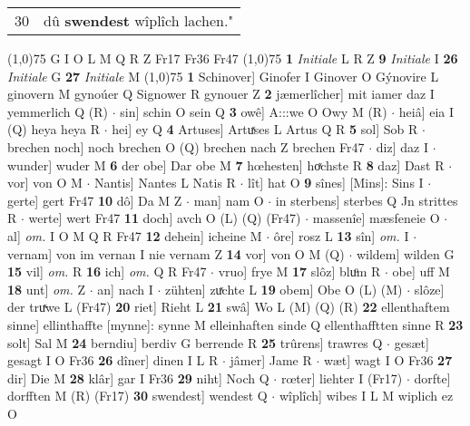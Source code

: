 \documentclass[8pt,a4paper,notitlepage]{article}
\begin{document}
\begin{table}[ht]
\begin{minipage}[t]{0.5\linewidth}
\begin{tabular}{rl}
30 & dû \textbf{swendest} wîplîch lachen."\\ 
\end{tabular}
\scriptsize
\line(1,0){75} \newline
G I O L M Q R Z Fr17 Fr36 Fr47 \newline
\line(1,0){75} \newline
\textbf{1} \textit{Initiale} L R Z  \textbf{9} \textit{Initiale} I  \textbf{26} \textit{Initiale} G  \textbf{27} \textit{Initiale} M  \newline
\line(1,0){75} \newline
\textbf{1} Schinover] Ginofer I Ginover O Gýnovire L ginovern M gynoúer Q Signower R gynouer Z \textbf{2} jæmerlîcher] mit iamer daz I yemmerlich Q (R)  $\cdot$ sin] schin O sein Q \textbf{3} owê] A:::we O Owy M (R)  $\cdot$ heiâ] eia I (Q) heya heya R  $\cdot$ hei] ey Q \textbf{4} Artuses] Artuͯses L Artus Q R \textbf{5} sol] Sob R  $\cdot$ brechen noch] noch brechen O (Q) brechen nach Z brechen Fr47  $\cdot$ diz] daz I  $\cdot$ wunder] wuder M \textbf{6} der obe] Dar obe M \textbf{7} hœhesten] hoͯchste R \textbf{8} daz] Dast R  $\cdot$ vor] von O M  $\cdot$ Nantis] Nantes L Natis R  $\cdot$ lît] hat O \textbf{9} sînes] [Mins]: Sins I  $\cdot$ gerte] gert Fr47 \textbf{10} dô] Da M Z  $\cdot$ man] nam O  $\cdot$ in sterbens] sterbes Q Jn strittes R  $\cdot$ werte] wert Fr47 \textbf{11} doch] avch O (L) (Q) (Fr47)  $\cdot$ massenîe] mæsfeneie O  $\cdot$ al] \textit{om.} I O M Q R Fr47 \textbf{12} dehein] icheine M  $\cdot$ ôre] rosz L \textbf{13} sîn] \textit{om.} I  $\cdot$ vernam] von im vernan I nie vernam Z \textbf{14} vor] von O M (Q)  $\cdot$ wildem] wilden G \textbf{15} vil] \textit{om.} R \textbf{16} ich] \textit{om.} Q R Fr47  $\cdot$ vruo] frye M \textbf{17} slôz] bluͦm R  $\cdot$ obe] uff M \textbf{18} unt] \textit{om.} Z  $\cdot$ an] nach I  $\cdot$ zühten] zuͯchte L \textbf{19} obem] Obe O (L) (M)  $\cdot$ slôze] der truͯwe L (Fr47) \textbf{20} riet] Rieht L \textbf{21} swâ] Wo L (M) (Q) (R) \textbf{22} ellenthaftem sinne] ellinthaffte [mynne]: synne M elleinhaften sinde Q ellenthafftten sinne R \textbf{23} solt] Sal M \textbf{24} berndiu] berdiv G berrende R \textbf{25} trûrens] trawres Q  $\cdot$ gesæt] gesagt I O Fr36 \textbf{26} dîner] dinen I L R  $\cdot$ jâmer] Jame R  $\cdot$ wæt] wagt I O Fr36 \textbf{27} dir] Die M \textbf{28} klâr] gar I Fr36 \textbf{29} niht] Noch Q  $\cdot$ rœter] liehter I (Fr17)  $\cdot$ dorfte] dorfften M (R) (Fr17) \textbf{30} swendest] wendest Q  $\cdot$ wîplîch] wibes I L M wiplich ez O \newline

\end{minipage}
\end{table}
\end{document}
